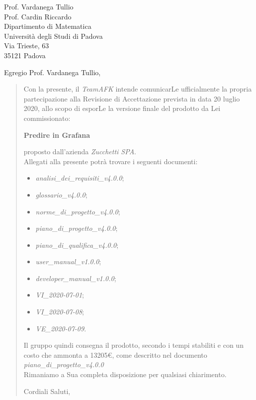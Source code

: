 \begin{letter}{
		Prof. Vardanega Tullio \\
		Prof. Cardin Riccardo \\
		Dipartimento di Matematica \\
		Università degli Studi di Padova \\
		Via Trieste, 63 \\
		35121 Padova}
		
\opening{Egregio Prof. Vardanega Tullio,}

\begin{quotation}
Con la presente, il \textit{TeamAFK} intende comunicarLe ufficialmente la propria partecipazione alla Revisione di Accettazione prevista in data 20 luglio 2020, allo scopo di esporLe la versione finale del prodotto da Lei commissionato:

\begin{center}
	\textbf{Predire in Grafana}
\end{center}

\noindent proposto dall'azienda \textit{Zucchetti SPA}.\\
Allegati alla presente potrà trovare i seguenti documenti:
\begin{itemize}
	\item \textit{analisi\_dei\_requisiti\_v4.0.0};
	
	\item \textit{glossario\_v4.0.0};
	
	\item \textit{norme\_di\_progetto\_v4.0.0};

	\item \textit{piano\_di\_progetto\_v4.0.0};

	\item \textit{piano\_di\_qualifica\_v4.0.0};
	
	\item \textit{user\_manual\_v1.0.0};
	\item \textit{developer\_manual\_v1.0.0};
	
	\item \textit{VI\_2020-07-01};
	\item \textit{VI\_2020-07-08};
	\item \textit{VE\_2020-07-09}.
\end{itemize}
\pagebreak
\noindent 
Il gruppo quindi consegna il prodotto, secondo i tempi stabiliti e con un costo che ammonta a 13205€, come descritto nel documento \textit{piano\_di\_progetto\_v4.0.0}\\
Rimaniamo a Sua completa disposizione per qualsiasi chiarimento.

\vspace{0.5cm}
\closing{ Cordiali Saluti,}
	

\end{quotation}
		
\end{letter}